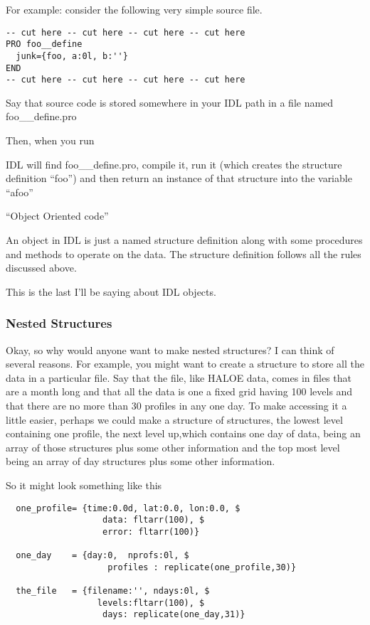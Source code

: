     For example: consider the following very simple source file.

\begin{IDLExample}
\begin{verbatim}    
-- cut here -- cut here -- cut here -- cut here 
PRO foo__define
  junk={foo, a:0l, b:''}
END 
-- cut here -- cut here -- cut here -- cut here 
\end{verbatim}
\end{IDLExample}


Say that source code is stored somewhere in your IDL path in a file
named foo\_\_define.pro

Then, when you run 

IDL will find foo\_\_define.pro, compile it, run it (which creates the
structure definition ``foo'') and then return an instance of that
structure into the variable ``afoo''


  \item ``Object Oriented code''
    
    An object in IDL is just a named structure definition along with
    some procedures and methods to operate on the data. The structure
    definition follows all the rules discussed above.

   This is the last I'll be saying about IDL objects.

\ei

\subsubsection{Nested Structures}

Okay, so why would anyone want to make nested structures? I can think
of several reasons. For example, you might want to create a structure
to store all the data in a particular file. Say that the file, like
HALOE data, comes in files that are a month long and that all the data
is one a fixed grid having 100 levels and that there are no more than
30 profiles in any one day.  To make accessing it a little easier,
perhaps we could make a structure of structures, the lowest level
containing one profile, the next level up,which contains one day of
data, being an array of those structures plus some other information
and the top most level being an array of day structures plus some
other information.

So it might look something like this

\begin{IDLExample}\begin{verbatim}
  one_profile= {time:0.0d, lat:0.0, lon:0.0, $
                   data: fltarr(100), $
                   error: fltarr(100)}

  one_day    = {day:0,  nprofs:0l, $
                    profiles : replicate(one_profile,30)}

  the_file   = {filename:'', ndays:0l, $
                  levels:fltarr(100), $
                   days: replicate(one_day,31)}
\end{verbatim}\end{IDLExample}


